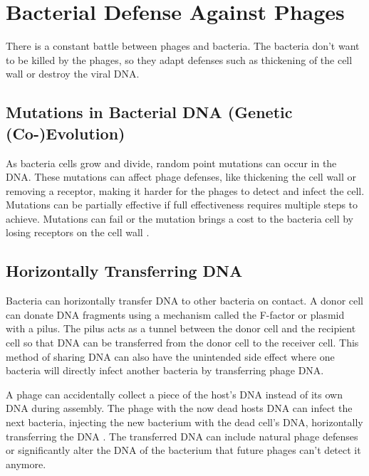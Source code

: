 \section{Bacterial Defense Against Phages} 
\label{sec:literaturereview:bacterial_defense_against_phages}
There is a constant battle between phages and bacteria. 
The bacteria don't want to be killed by the phages, so they adapt defenses such as thickening of the cell wall or destroy the viral DNA. 

\subsection{Mutations in Bacterial DNA (Genetic (Co-)Evolution)}
As bacteria cells grow and divide, random point mutations can occur in the DNA. 
These mutations can affect phage defenses, like thickening the cell wall or removing a receptor, making it harder for the phages to detect and infect the cell. 
Mutations can be partially effective if full effectiveness requires multiple steps to achieve. 
Mutations can fail or the mutation brings a cost to the bacteria cell by losing receptors on the cell wall \cite{lenskiTWOSTEPRESISTANCEESCHERICHIA1984}. 

\subsection{Horizontally Transferring DNA}
Bacteria can horizontally transfer DNA to other bacteria on contact. 
A donor cell can donate DNA fragments using a mechanism called the F-factor or plasmid with a pilus. 
The pilus acts as a tunnel between the donor cell and the recipient cell so that DNA can be transferred from the donor cell to the receiver cell. 
This method of sharing DNA can also have the unintended side effect where one bacteria will directly infect another bacteria by transferring phage DNA. 

A phage can accidentally collect a piece of the host's DNA instead of its own DNA during assembly. 
The phage with the now dead hosts DNA can infect the next bacteria, injecting the new bacterium with the dead cell's DNA, horizontally transferring the DNA \cite{tamangHorizontalGeneTransfer2023, kasmanBacteriophages2025}. 
The transferred DNA can include natural phage defenses or significantly alter the DNA of the bacterium that future phages can't detect it anymore. 

